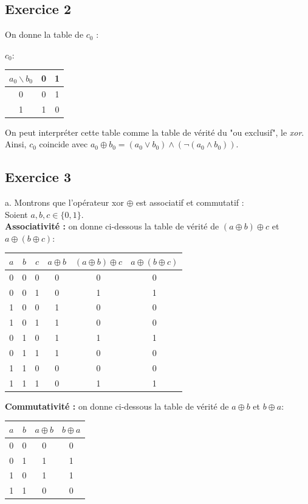 \documentclass[11pt, a4 paper]{article}
\begin{document}
\subsection{Exercice 2}
On donne la table de $c_0$ :
\begin{center}
    $c_0 \colon$
    \begin{tabular}{||c | c | c ||} 
     \hline
     $a_0 \backslash b_0$ & 0 & 1 \\ [0.5ex] 
     \hline\hline
     0 & 0 & 1  \\ 
     \hline
     1 & 1 & 0 \\
     \hline
    \end{tabular}
\end{center}
On peut interpréter cette table comme la table de vérité du "ou exclusif", le \textit{xor}. Ainsi, $c_0$ coincide avec $a_0 \oplus b_0 = (a_0 \vee b_0) \wedge (\neg (a_0 \wedge b_0))$.

\subsection{Exercice 3}
a. Montrons que l'opérateur xor $\oplus$ est associatif et commutatif :\\
Soient $a, b, c \in \{0, 1\}$.\\

\textbf{Associativité :} on donne ci-dessous la table de vérité de $(a \oplus b) \oplus c$ et $a \oplus (b \oplus c)$:
\begin{center}
    \begin{tabular}{||c | c | c | c | c | c ||} 
     \hline
     $a$ & $b$ & $c$ & $a \oplus b$ & $(a \oplus b) \oplus c$ & $a \oplus (b \oplus c)$ \\ [0.5ex] 
     \hline\hline
     0 & 0 & 0 & 0 & 0 & 0\\ 
     0 & 0 & 1 & 0 & 1 & 1\\ 
     1 & 0 & 0 & 1 & 0 & 0\\ 
     1 & 0 & 1 & 1 & 0 & 0\\ 
     0 & 1 & 0 & 1 & 1 & 1\\ 
     0 & 1 & 1 & 1 & 0 & 0\\ 
     1 & 1 & 0 & 0 & 0 & 0\\ 
     1 & 1 & 1 & 0 & 1 & 1\\ 
     \hline
    \end{tabular}
\end{center}

\textbf{Commutativité :} on donne ci-dessous la table de vérité de $a \oplus b$ et $b \oplus a$:
\begin{center}
    \begin{tabular}{||c | c | c | c ||} 
     \hline
     $a$ & $b$ & $a \oplus b$ & $b \oplus a$ \\ [0.5ex] 
     \hline\hline
    0 & 0 & 0 & 0 \\
    0 & 1 & 1 & 1 \\
    1 & 0 & 1 & 1 \\
    1 & 1 & 0 & 0 \\
     \hline
    \end{tabular}
\end{center}
\end{document}
